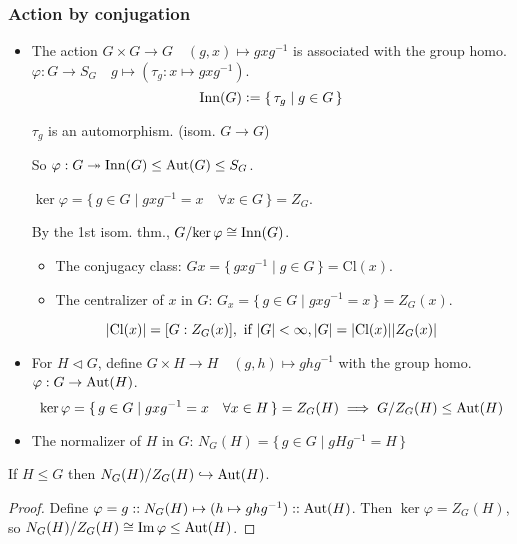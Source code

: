 \subsubsection{Action by conjugation}
\begin{itemize}
  \item The action $G \times G \to G \quad (g,x) \mapsto gxg^{-1}$ is
    associated with the group homo. $\varphi: G \to S_G \quad g \mapsto
    (\tau_g: x \mapsto gxg^{-1})$.
    \[
      \operatorname{Inn}(G) \vcentcolon= \{\, \tau_g \mid g \in G \,\}
    \]

    \begin{fact}
      $\tau_g$ is an automorphism. (isom. $G \to G$)
    \end{fact}

    So $\varphi: G \twoheadrightarrow \operatorname{Inn}(G) \le \operatorname{Aut}(G) \le S_G$.

    $\ker\varphi = \{\, g\in G \mid gxg^{-1} = x \quad \forall x \in G \,\}
    = Z_G$.

    By the 1st isom. thm., ${G}/{\ker\varphi} \cong \operatorname{Inn}(G)$.
    \begin{itemize}
      \item The conjugacy class:
        $Gx = \{\, gxg^{-1} \mid g \in G \,\} = \text{Cl}(x)$.
      \item The centralizer of $x$ in $G$:
        $G_x = \{\, g \in G \mid gxg^{-1} = x \,\} = Z_G(x)$.
    \end{itemize}
    \[
      \lvert\text{Cl}(x)\rvert = [G:Z_G(x)], \text{~if~} \lvert G\rvert < \infty,
      \lvert G\rvert = \lvert\text{Cl}(x)\rvert\lvert Z_G(x)\rvert
    \]
  \item For $H \lhd G$, define $G \times H \to H \quad (g, h) \mapsto ghg^{-1}$
    with the group homo. $\varphi: G \to \operatorname{Aut}(H)$.
    \[
      \ker\varphi = \{\, g\in G \mid gxg^{-1} = x \quad \forall x \in H \,\}
      = Z_G(H)
      \implies {G}/{Z_G(H)} \le \operatorname{Aut}(H)
    \]
  \item The normalizer of $H$ in $G$:
    $N_G(H) = \{\, g\in G \mid gHg^{-1} = H \,\}$

\end{itemize}

\begin{theorem}
  If $H \leq G$ then ${N_G(H)}/{Z_G(H)} \hookrightarrow \operatorname{Aut}(H)$.
\end{theorem}
\begin{proof}
  Define $\varphi = g :: N_G(H) \mapsto (h \mapsto g h g^{-1}) :: \operatorname{Aut}(H)$. Then
  $\ker \varphi = Z_G(H)$, so ${N_G(H)}/{Z_G(H)} \cong \operatorname{Im} \varphi \leq \operatorname{Aut}(H)$.
\end{proof}
